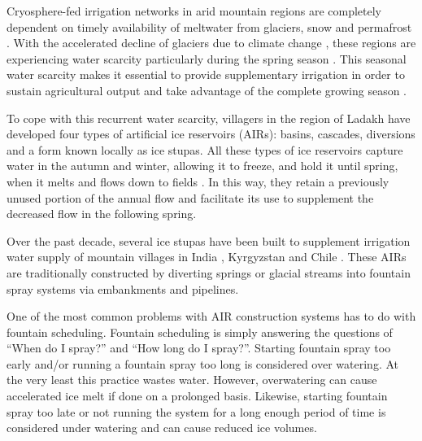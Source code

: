 \documentclass[tc, manuscript]{copernicus}
\begin{document}
\introduction

Cryosphere-fed irrigation networks in arid mountain regions are completely dependent on timely availability of
meltwater from glaciers, snow and permafrost \citep{immerzeelImportanceVulnerabilityWorld2020, farhanHydrologicalRegimesConjunction2015,
tveitenGlacierGrowingLocal2007}. With the accelerated decline of glaciers due to climate change
\citep{nusserLocalKnowledgeGlobal2016}, these regions are experiencing water scarcity particularly during the
spring season \citep{norphelSnowWaterHarvesting2015}. This seasonal water scarcity makes it essential to provide
supplementary irrigation in order to sustain agricultural output and take advantage of the complete growing
season \citep{nusserLocalKnowledgeGlobal2016, vincentEnergyClimateChange2009}.

To cope with this recurrent water scarcity, villagers in the region of Ladakh have developed four types of
artificial ice reservoirs (AIRs): basins, cascades, diversions and a form known locally as ice stupas. All these
types of ice reservoirs capture water in the autumn and winter, allowing it to freeze, and hold it until spring,
when it melts and flows down to fields \citep{ipccChapterHighMountain2019, vinceGlacierMan2009, clouseLadakhArtificialGlaciers2017,
nusserSociohydrologyArtificialGlaciers2019}. In this way, they retain a previously
unused portion of the annual flow and facilitate its use to supplement the decreased flow in the following
spring. 

Over the past decade, several ice stupas have been built to supplement irrigation water supply of mountain
villages in India \citep{wangchukIceStupaCompetition2020, palmerStoringFrozenWater2022,
aggarwalAdaptationClimateChange2021}, Kyrgyzstan \citep{bbcnewsBrightArtificialGlacier2020} and Chile
\citep{reutersConservationistsChileAim2021}. These AIRs are traditionally constructed by diverting springs or
glacial streams into fountain spray systems via embankments and pipelines. 

One of the most common problems with AIR construction systems has to do with fountain scheduling. Fountain
scheduling is simply answering the questions of “When do I spray?” and “How long do I spray?”. Starting fountain
spray too early and/or running a fountain spray too long is considered over watering. At the very least this
practice wastes water. However, overwatering can cause accelerated ice melt if done on a prolonged basis.
Likewise, starting fountain spray too late or not running the system for a long enough period of time is
considered under watering and can cause reduced ice volumes.
\end{document}
